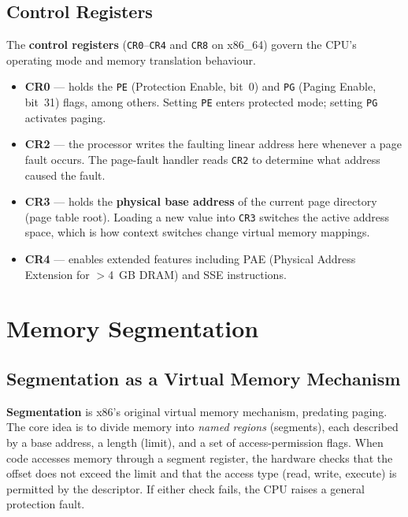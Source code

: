 \documentclass[11pt]{article}
\begin{document}
\subsection{Control Registers}

The \textbf{control registers} (\texttt{CR0}--\texttt{CR4} and \texttt{CR8} on x86\_64)
govern the CPU's operating mode and memory translation behaviour.

\begin{itemize}
    \item \textbf{CR0} --- holds the \texttt{PE} (Protection Enable, bit~0) and
          \texttt{PG} (Paging Enable, bit~31) flags, among others. Setting \texttt{PE}
          enters protected mode; setting \texttt{PG} activates paging.
    \item \textbf{CR2} --- the processor writes the faulting linear address here whenever
          a page fault occurs. The page-fault handler reads \texttt{CR2} to determine what
          address caused the fault.
    \item \textbf{CR3} --- holds the \textbf{physical base address} of the current
          page directory (page table root). Loading a new value into \texttt{CR3} switches
          the active address space, which is how context switches change virtual memory mappings.
    \item \textbf{CR4} --- enables extended features including PAE (Physical Address
          Extension for $>$4~GB DRAM) and SSE instructions.
\end{itemize}

\section{Memory Segmentation}

\subsection{Segmentation as a Virtual Memory Mechanism}

\textbf{Segmentation} is x86's original virtual memory mechanism, predating paging.
The core idea is to divide memory into \emph{named regions} (segments), each described by
a base address, a length (limit), and a set of access-permission flags. When code accesses
memory through a segment register, the hardware checks that the offset does not exceed the
limit and that the access type (read, write, execute) is permitted by the descriptor. If
either check fails, the CPU raises a general protection fault.
\end{document}
